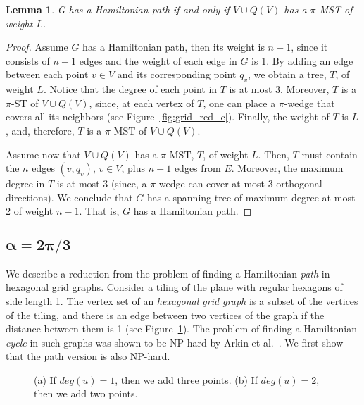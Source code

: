 \documentclass[11pt]{article}
\newtheorem{lemma}[theorem]{Lemma}
\begin{document}
\begin{lemma}
\label{lem:hardness1}
G has a Hamiltonian path if and only if $V \cup Q(V)$ has a $\pi$-MST of weight $L$. 
\end{lemma}
\begin{proof}
Assume $G$ has a Hamiltonian path, then its weight is $n-1$, since it consists of $n-1$ edges and the weight of each edge in $G$ is 1.
By adding an edge between each point $v \in V$ and its corresponding point $q_v$, we obtain a tree, $T$, of weight $L$. Notice that the degree of each point in $T$ is at most 3. Moreover, $T$ is a $\pi$-ST of $V \cup Q(V)$, since, at each vertex of $T$, one can place a $\pi$-wedge that covers all its neighbors (see Figure~\ref{fig:grid_red_c}). Finally, the weight of $T$ is $L$, and, therefore, $T$ is a $\pi$-MST of $V \cup Q(V)$.

Assume now that $V \cup Q(V)$ has a $\pi$-MST, $T$, of weight $L$. Then, $T$ must contain the $n$ edges $(v,q_v)$, $v \in V$, plus $n-1$ edges from $E$. Moreover, the maximum degree in $T$ is at most 3 (since, a $\pi$-wedge can cover at most 3 orthogonal directions). We conclude that $G$ has a spanning tree of maximum degree at most 2 of weight $n-1$. That is, $G$ has a Hamiltonian path.
\end{proof}


\subsection{$\boldsymbol{\alpha=2\pi/3}$}

We describe a reduction from the problem of finding a Hamiltonian {\em path} in hexagonal grid graphs. 
Consider a tiling of the plane with regular hexagons of side length 1. The vertex set of an {\em hexagonal grid graph} is a subset of the vertices of the tiling, and there is an edge between two vertices of the graph if the distance between them is 1 (see Figure~\ref{fig:reduction120}). 
The problem of finding a Hamiltonian {\em cycle} in such graphs was shown to be NP-hard by Arkin et al.~\cite{AFIMMRPRX09}.
We first show that the path version is also NP-hard.

\begin{figure}[htb]
\centering
	\hspace{.75cm}
 	\caption{(a) If $deg(u)=1$, then we add three points. (b) If $deg(u)=2$, then we add two points.} \label{fig:reduction120}	
\end{figure} 
 
\end{document}
